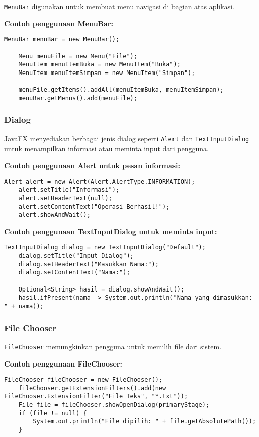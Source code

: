 \texttt{MenuBar} digunakan untuk membuat menu navigasi di bagian atas aplikasi.

\textbf{Contoh penggunaan MenuBar:}
\begin{lstlisting}[style=JavaStyle, caption=Membuat MenuBar dalam JavaFX]
	MenuBar menuBar = new MenuBar();
	
	Menu menuFile = new Menu("File");
	MenuItem menuItemBuka = new MenuItem("Buka");
	MenuItem menuItemSimpan = new MenuItem("Simpan");
	
	menuFile.getItems().addAll(menuItemBuka, menuItemSimpan);
	menuBar.getMenus().add(menuFile);
\end{lstlisting}

\subsubsection{Dialog}

JavaFX menyediakan berbagai jenis dialog seperti \texttt{Alert} dan \texttt{TextInputDialog} untuk menampilkan informasi atau meminta input dari pengguna.

\textbf{Contoh penggunaan Alert untuk pesan informasi:}
\begin{lstlisting}[style=JavaStyle, caption=Menampilkan Dialog Alert]
	Alert alert = new Alert(Alert.AlertType.INFORMATION);
	alert.setTitle("Informasi");
	alert.setHeaderText(null);
	alert.setContentText("Operasi Berhasil!");
	alert.showAndWait();
\end{lstlisting}

\textbf{Contoh penggunaan TextInputDialog untuk meminta input:}
\begin{lstlisting}[style=JavaStyle, caption=Menggunakan TextInputDialog]
	TextInputDialog dialog = new TextInputDialog("Default");
	dialog.setTitle("Input Dialog");
	dialog.setHeaderText("Masukkan Nama:");
	dialog.setContentText("Nama:");
	
	Optional<String> hasil = dialog.showAndWait();
	hasil.ifPresent(nama -> System.out.println("Nama yang dimasukkan: " + nama));
\end{lstlisting}

\subsubsection{File Chooser}

\texttt{FileChooser} memungkinkan pengguna untuk memilih file dari sistem.

\textbf{Contoh penggunaan FileChooser:}
\begin{lstlisting}[style=JavaStyle, caption=Memilih File dengan FileChooser]
	FileChooser fileChooser = new FileChooser();
	fileChooser.getExtensionFilters().add(new FileChooser.ExtensionFilter("File Teks", "*.txt"));
	File file = fileChooser.showOpenDialog(primaryStage);
	if (file != null) {
		System.out.println("File dipilih: " + file.getAbsolutePath());
	}
\end{lstlisting}

